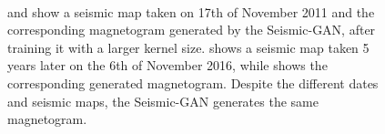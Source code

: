 \documentclass[11pt,a4paper,onecolumn]{report}
\begin{document}
\begin{figure}[t]%
  \centering
   \\
  \caption[]{ and 
  show a seismic map taken on 17th of November 2011 and the corresponding
  magnetogram generated by the Seismic-GAN, after training it with a larger
  kernel size.  shows a seismic map taken 5 years
  later on the 6th of November 2016, while  shows
  the corresponding generated magnetogram. Despite the different dates and
  seismic maps, the Seismic-GAN generates the same magnetogram.}
  \label{fig:mode_collapse}
\end{figure}
\end{document}
